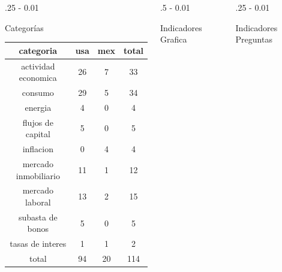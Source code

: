 \documentclass{iteraposter}\usepackage[]{graphicx}\usepackage[]{color}
\begin{document}
\begin{frame}
\begin{columns}[onlytextwidth]
\end{columns}




\begin{columns}[onlytextwidth]
  
  \begin{column}{.25 \textwidth - 0.01 \textwidth}
    \begin{block}{Categor\'ias}
      \centering
      \small
      
\begin{tabular}{c|c|c|c}
\hline
categoria & usa & mex & total\\
\hline
actividad economica & 26 & 7 & 33\\
\hline
consumo & 29 & 5 & 34\\
\hline
energia & 4 & 0 & 4\\
\hline
flujos de capital & 5 & 0 & 5\\
\hline
inflacion & 0 & 4 & 4\\
\hline
mercado inmobiliario & 11 & 1 & 12\\
\hline
mercado laboral & 13 & 2 & 15\\
\hline
subasta de bonos & 5 & 0 & 5\\
\hline
tasas de interes & 1 & 1 & 2\\
\hline
total & 94 & 20 & 114\\
\hline
\end{tabular}


      \normalsize
    \end{block}
  \end{column}

  \begin{column}{.5 \textwidth - 0.01 \textwidth}
    \begin{block}{Indicadores}
      Grafica 
    \end{block}
  \end{column}
  
  \begin{column}{.25 \textwidth - 0.01 \textwidth}
    \begin{block}{Indicadores}
      Preguntas
    \end{block}
  \end{column}

\end{columns}


\end{frame}
\end{document}
